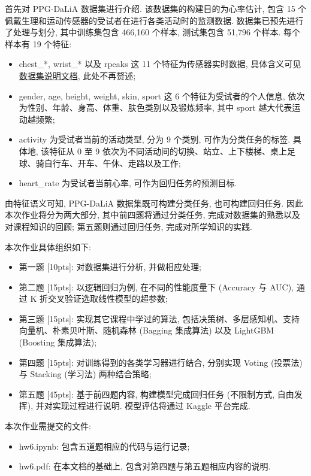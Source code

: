 \documentclass[a4paper,UTF8]{article}
\numberwithin{equation}{section}
\numberwithin{equation}{section}
\theoremstyle{definition}
\begin{document}
首先对 PPG-DaLiA 数据集进行介绍. 该数据集的构建目的为心率估计, 包含 15 个佩戴生理和运动传感器的受试者在进行各类活动时的监测数据.
数据集已预先进行了处理与划分, 其中训练集包含 466,160 个样本, 测试集包含 51,796 个样本. 每个样本有 19 个特征:
\begin{itemize}
    \item chest\_*, wrist\_* 以及 rpeaks 这 11 个特征为传感器实时数据, 具体含义可见\href{https://archive.ics.uci.edu/ml/machine-learning-databases/00495/readme.pdf}{数据集说明文档}, 此处不再赘述;
    \item gender, age, height, weight, skin, sport 这 6 个特征为受试者的个人信息, 依次为性别、年龄、身高、体重、肤色类别以及锻炼频率, 其中 sport 越大代表运动越频繁;
    \item activity 为受试者当前的活动类型, 分为 9 个类别, 可作为分类任务的标签. 具体地, 该特征从 0 至 9 依次为不同活动间的切换、站立、上下楼梯、桌上足球、骑自行车、开车、午休、走路以及工作;
    \item heart\_rate 为受试者当前心率, 可作为回归任务的预测目标.
\end{itemize} 

由特征语义可知, PPG-DaLiA 数据集既可构建分类任务, 也可构建回归任务.
因此本次作业将分为两大部分, 其中前四题将通过分类任务, 完成对数据集的熟悉以及对课程知识的回顾; 第五题则通过回归任务, 完成对所学知识的实践.

本次作业具体组织如下:
\begin{itemize}
    \item 第一题 [10pts]: 对数据集进行分析, 并做相应处理;
    \item 第二题 [15pts]: 以逻辑回归为例, 在不同的性能度量下 (Accuracy 与 AUC), 通过 K 折交叉验证选取线性模型的超参数;
    \item 第三题 [15pts]: 实现其它课程中学过的算法, 包括决策树、多层感知机、支持向量机、朴素贝叶斯、随机森林 (Bagging 集成算法) 以及 LightGBM (Boosting 集成算法);
    \item 第四题 [15pts]: 对训练得到的各类学习器进行结合, 分别实现 Voting (投票法) 与 Stacking (学习法) 两种结合策略;
    \item 第五题 [45pts]: 基于前四题内容, 构建模型完成回归任务 (不限制方式, 自由发挥), 并对实现过程进行说明. 模型评估将通过 Kaggle 平台完成.
\end{itemize}

本次作业需提交的文件:
\begin{itemize}
    \item hw6.ipynb: 包含五道题相应的代码与运行记录;
    \item hw6.pdf: 在本文档的基础上, 包含对第四题与第五题相应内容的说明.
\end{itemize}
\end{document}
